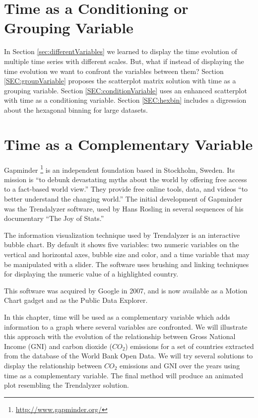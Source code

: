 \documentclass[smallroyalvopaper]{memoir}
\begin{document}
\chapter{Time as a Conditioning or Grouping Variable}
\label{sec:orgheadline20}
\label{cha:timeGroupFactor}

In Section \ref{sec:differentVariables} we learned to display the time evolution of multiple time series with different scales. But, what if instead of displaying the time evolution we want to confront the variables between them? Section \ref{SEC:groupVariable} proposes the scatterplot matrix solution with time as a grouping variable. Section \ref{SEC:conditionVariable} uses an enhanced scatterplot with time as a conditioning variable. Section \ref{SEC:hexbin} includes a digression about the hexagonal binning for large datasets.

\chapter{Time as a Complementary Variable}
\label{sec:orgheadline21}
\label{cha:timeComplementary}

Gapminder \footnote{\url{http://www.gapminder.org/}} is an independent foundation based in Stockholm, Sweden.  Its mission is ``to debunk devastating myths about the world by offering free access to a fact-based world view.'' They provide free online tools, data, and videos ``to better understand the changing world.'' The initial development of Gapminder was the Trendalyzer software, used by Hans Rosling in several sequences of his documentary ``The Joy of Stats.''

The information visualization technique used by Trendalyzer is an interactive bubble chart. By default it shows five variables: two numeric variables on the vertical and horizontal axes, bubble size and color, and a time variable that may be manipulated with a slider. The software uses brushing and linking techniques for displaying the numeric value of a highlighted country.

This software was acquired by Google in 2007, and is now available as a Motion Chart gadget and as the Public Data Explorer.

In this chapter, time will be used as a complementary variable which adds information to a graph where several variables are confronted. We will illustrate this approach with the evolution of the relationship between Gross National Income (GNI) and carbon dioxide (\(CO_2\)) emissions for a set of countries extracted from the database of the World Bank Open Data. We will try several solutions to display the relationship between \(CO_2\) emissions and GNI over the years using time as a complementary variable. The final method will produce an animated plot resembling the Trendalyzer solution.
\end{document}
